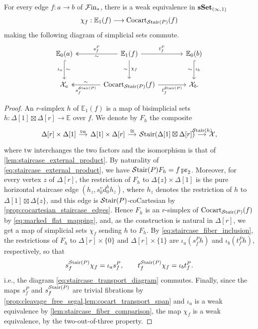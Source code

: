 \documentclass[10pt,reqno]{amsart}
\begin{document}
\begin{proposition}
\label{prop:staircase_transport_comparison}
For every edge $f:a\to b$ of $\mathcal{F}\mathrm{in}_*$, there is a weak equivalence
in $\mathbf{sSet}_{(\infty,1)}$
\[
 \chi_f:\mathbb E_1(f)\longrightarrow\operatorname{Cocart}_{\mathcal{S}\mathrm{tair}(P)}(f)
\]
making the following diagram of simplicial sets commute.
\begin{equation}
\label{eq:staircase_transport_diagram}
\begin{tikzcd}[ampersand replacement=\&, sep=large]
\mathbb E_0(a)\arrow[d,hook,"\iota_a"',"\sim"]
\&\mathbb E_1(f)\arrow[l,two heads,"s_f^P"',"\sim"]
 \arrow[r,"t_f^P"]\arrow[d,"\chi_f","\sim"']
\&\mathbb E_0(b)\arrow[d,hook,"\iota_b","\sim"']\\
\mathcal X_a
\&\Cocart_{\Stair(P)}(f)
 \arrow[l,two heads,"s_f^{\Stair(P)}","\sim"']
 \arrow[r,"t_f^{\Stair(P)}"']
\&\mathcal X_b.
\end{tikzcd}
\end{equation}
\end{proposition}

\begin{proof}
An $r$-simplex $h$ of $\mathbb E_1(f)$ is a map of bisimplicial
sets $h:\Delta[1]\boxtimes\Delta[r]\to\mathbb E$ over $f$. We
denote by $F_h$ the composite
\[
\begin{tikzcd}[ampersand replacement=\&,column sep=small]
\Delta[r]\times\Delta[1]\arrow[r,"\mathrm{tw}"]
\&\Delta[1]\times\Delta[r]\arrow[r,"\cong"]
\&\Stair(\Delta[1]\boxtimes\Delta[r])
 \arrow[r,"\Stair(h)"]\&\mathcal X,
\end{tikzcd}
\]
where $\mathrm{tw}$ interchanges the two factors and the isomorphism
is that of \cref{lem:staircase_external_product}. By naturality of
\eqref{eq:staircase_external_product}, we have
$\mathcal{S}\mathrm{tair}(P)F_h=f\operatorname{pr}_2$. Moreover, for every vertex $z$ of
$\Delta[r]$, the restriction of $F_h$ to
$\Delta\{z\}\times\Delta[1]$ is the pure horizontal staircase edge
$(h_z,s_0^v d_0^h h_z)$, where $h_z$ denotes the restriction of
$h$ to $\Delta[1]\boxtimes\Delta\{z\}$, and this edge is
$\mathcal{S}\mathrm{tair}(P)$-coCartesian by \cref{prop:cocartesian_staircase_edges}.
Hence $F_h$ is an $r$-simplex of $\operatorname{Cocart}_{\mathcal{S}\mathrm{tair}(P)}(f)$ by
\eqref{eq:marked_flat_mapping}, and, as the construction is natural in
$\Delta[r]$, we get a map of simplicial sets $\chi_f$ sending $h$
to $F_h$. By \eqref{eq:staircase_fiber_inclusion}, the restrictions
of $F_h$ to $\Delta[r]\times\{0\}$ and $\Delta[r]\times\{1\}$ are
$\iota_a(s_f^P h)$ and $\iota_b(t_f^P h)$, respectively, so that
\begin{equation}
\label{eq:staircase_transport_identities}
 s_f^{\mathcal{S}\mathrm{tair}(P)}\chi_f=\iota_a s_f^P,
 \qquad
 t_f^{\mathcal{S}\mathrm{tair}(P)}\chi_f=\iota_b t_f^P.
\end{equation}
i.e., the diagram \eqref{eq:staircase_transport_diagram} commutes.
Finally, since the maps $s_f^P$ and $s_f^{\mathcal{S}\mathrm{tair}(P)}$ are trivial
fibrations by \cref{prop:cleavage_free_segal,lem:cocart_transport_span}
and $\iota_a$ is a weak equivalence by
\cref{lem:staircase_fiber_comparison}, the map $\chi_f$ is a weak
equivalence, by the two-out-of-three property.
\end{proof}
\end{document}
